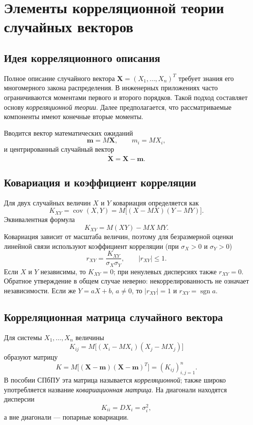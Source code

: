 \section{Элементы корреляционной теории случайных векторов}
\label{sec:correlation-random-vectors}

\subsection{Идея корреляционного описания}

Полное описание случайного вектора $\mathbf X=(X_1,\ldots,X_n)^T$ требует
знания его многомерного закона распределения. В инженерных приложениях часто
ограничиваются моментами первого и второго порядков. Такой подход составляет
основу \emph{корреляционной теории}. Далее предполагается, что рассматриваемые
компоненты имеют конечные вторые моменты.

Вводится вектор математических ожиданий
\[
    \mathbf m=M\mathbf X,
    \qquad m_i=MX_i,
\]
и центрированный случайный вектор
\[
    \mathring{\mathbf X}=\mathbf X-\mathbf m.
\]

\subsection{Ковариация и коэффициент корреляции}

Для двух случайных величин $X$ и $Y$ ковариация определяется как
\[
    K_{XY}=\operatorname{cov}(X,Y)
    =M\bigl[(X-MX)(Y-MY)\bigr].
\]
Эквивалентная формула
\[
    K_{XY}=M(XY)-MX\,MY.
\]
Ковариация зависит от масштаба величин, поэтому для безразмерной оценки
линейной связи используют коэффициент корреляции (при $\sigma_X>0$ и $\sigma_Y>0$)
\[
    r_{XY}=\frac{K_{XY}}{\sigma_X\sigma_Y},
    \qquad |r_{XY}|\leq1.
\]
Если $X$ и $Y$ независимы, то $K_{XY}=0$; при ненулевых дисперсиях также
$r_{XY}=0$. Обратное утверждение
в общем случае неверно: некоррелированность не означает независимости.
Если же $Y=aX+b$, $a\neq0$, то $|r_{XY}|=1$ и $r_{XY}=\operatorname{sgn}a$.

\subsection{Корреляционная матрица случайного вектора}

Для системы $X_1,\ldots,X_n$ величины
\[
    K_{ij}=M\bigl[(X_i-MX_i)(X_j-MX_j)\bigr]
\]
образуют матрицу
\[
    K=M\bigl[(\mathbf X-\mathbf m)(\mathbf X-\mathbf m)^T\bigr]
      =(K_{ij})_{i,j=1}^n.
\]
В пособии СПбПУ эта матрица называется \emph{корреляционной}; также широко
употребляется название \emph{ковариационная матрица}. На диагонали находятся
дисперсии
\[
    K_{ii}=DX_i=\sigma_i^2,
\]
а вне диагонали --- попарные ковариации.

